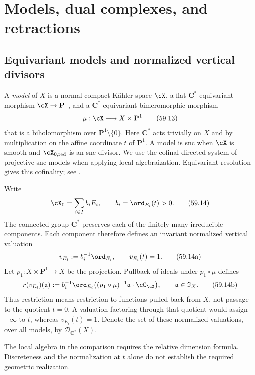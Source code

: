 \section{Models, dual complexes, and retractions}
\label{sec:mp-dual-models}

\subsection{Equivariant models and normalized vertical divisors}
\label{subsec:mp-dual-equivariant-models}

A \emph{model} of $X$ is a normal compact K\"ahler space $\cX$, a
flat $\mathbf C^*$-equivariant morphism $\cX\to\mathbf P^1$, and a
$\mathbf C^*$-equivariant bimeromorphic morphism
\[
       \mu:\cX\longrightarrow X\times\mathbf P^1
\tag{59.13}\label{eq:mp-analytic-model}
\]
that is a biholomorphism over $\mathbf P^1\setminus\{0\}$.
Here $\mathbf C^*$ acts trivially on $X$ and by multiplication
on the affine coordinate $t$ of $\mathbf P^1$. A model is snc
when $\cX$ is smooth and $\cX_{0,\mathrm{red}}$ is an snc divisor.
We use the cofinal directed system of projective snc models when
applying local algebraization. Equivariant resolution gives this
cofinality; see \cite[Remark~2.5.2]{MPTropicalV2}.

Write
\[
                         \cX_0=\sum_{i\in I}b_iE_i,
                         \qquad b_i=\ord_{E_i}(t)>0.
\tag{59.14}\label{eq:mp-central-fiber}
\]
The connected group $\mathbf C^*$ preserves each of the finitely
many irreducible components. Each component therefore defines an
invariant normalized vertical valuation
\[
 v_{E_i}:=b_i^{-1}\ord_{E_i},\qquad v_{E_i}(t)=1.
\tag{59.14a}\label{eq:mp-normalized-vertical-valuation}
\]
Let $p_1:X\times\mathbf P^1\to X$ be the projection. Pullback of
ideals under $p_1\circ\mu$ defines
\[
 r(v_{E_i})(\mathfrak a)
   :=b_i^{-1}\ord_{E_i}
      \bigl((p_1\circ\mu)^{-1}\mathfrak a\cdot\cO_{\cX}\bigr),
 \qquad \mathfrak a\in\mathfrak I_X.
\tag{59.14b}\label{eq:mp-vertical-restriction}
\]
Thus restriction means restriction to functions pulled back from
$X$, not passage to the quotient $t=0$. A valuation factoring
through that quotient would assign $+\infty$ to $t$, whereas
$v_{E_i}(t)=1$. Denote the set of these normalized valuations,
over all models, by $\mathcal D_{\mathbf C^*}(X)$.

The local algebra in the comparison requires the relative
dimension formula. Discreteness and the normalization at $t$
alone do not establish the required geometric realization.


